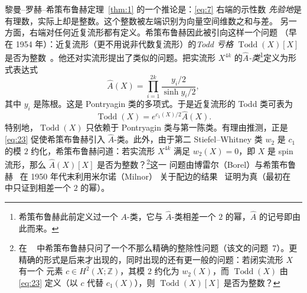 \documentclass[11pt]{amsart}
\theoremstyle{definition}
\theoremstyle{remark}
\theoremstyle{plain}
\numberwithin{equation}{section}
\renewcommand{\:}{\colon}
\newcommand{\Ahat}{{\hat A}}
\newcommand{\ZZ}{{\mathbb Z}}
\DeclareMathOperator{\Sign}{Sign}
\DeclareMathOperator{\Todd}{Todd}
\begin{document}

黎曼–罗赫–希策布鲁赫定理~\ref{thm:1} 的一个推论是：\eqref{eq:7} 右端的示性数
{\it 先验地}是有理数，实际上却是整数。这个整数被左端识别为向量空间维数之和与差。
另一方面，右端对任何近复流形都有定义。希策布鲁赫因此被引向这样一个问题
（早在 1954 年）：近复流形（更不用说非代数复流形）的{\it Todd 亏格}
$\Todd(X)[X]$ 是否为整数~\cite{H3}。他还对实流形提出了类似的问题。把实流形
$X^{4k}$ 的{\it $\Ahat$-类}\footnote{希策布鲁赫此前定义过一个 $A$-类，它与
$\Ahat$-类相差一个 $2$ 的幂，$\Ahat$ 的记号即由此而来。}定义为形式表达式
  \begin{equation}\label{eq:22}
     \Ahat(X) = \prod_{i=1}^{2k} \frac{y_i/2}{\sinh y_i/2},
  \end{equation}
其中 $y_i$ 是陈根。这是 Pontryagin 类的多项式。于是近复流形的 Todd 类可表为
  \begin{equation}\label{eq:23}
     \Todd(X) = e^{c_1(X)/2} \Ahat(X).
  \end{equation}
特别地，$\Todd(X)$ 只依赖于 Pontryagin 类与第一陈类。有理由推测，正是
\eqref{eq:23} 促使希策布鲁赫引入 $\Ahat$-类。此外，由于第二 Stiefel–Whitney
类 $w_2$ 是 $c_1$ 的模 $2$ 约化，希策布鲁赫问道：若实流形 $X^{4k}$ 满足
$w_2(X)=0$，即 $X$ 是 spin 流形，那么 $\Ahat(X)[X]$ 是否为整数？\footnote{在
~\cite{H3} 中希策布鲁赫只问了一个不那么精确的整除性问题（该文的问题~7）。更
精确的形式是后来才出现的，同时出现的还有更一般的问题：若闭实流形 $X$ 有一个
元素 $c\in H^2(X;\ZZ)$，其模 $2$ 约化为 $w_2(X)$，而 $\Todd(X)$ 由
\eqref{eq:23} 定义（以 $c$ 代替 $c_1(X)$），则 $\Todd(X)[X]$ 是否为整数？}这一
问题由博雷尔（Borel）与希策布鲁赫~\cite{BH3} 在 1950 年代末利用米尔诺（Milnor）
关于配边的结果~\cite{Mi1} 证明为真（最初在~\cite{BH2} 中只证到相差一个 $2$ 的幂）。

\end{document}
